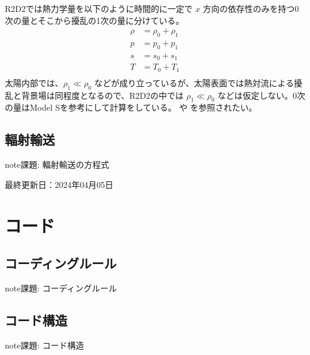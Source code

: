 \documentclass[letterpaper,10pt,dvipdfmx,report]{sphinxmanual}
\begin{document}
\sphinxAtStartPar
R2D2では熱力学量を以下のように時間的に一定で \(x\) 方向の依存性のみを持つ0次の量とそこから擾乱の1次の量に分けている。
\begin{equation*}
\begin{split}\rho &= \rho_0 + \rho_1 \\
p &= p_0 + p_1 \\
s &= s_0 + s_1 \\
T &= T_0 + T_1 \\\end{split}
\end{equation*}
\sphinxAtStartPar
太陽内部では、\(\rho_1 \ll \rho_0\) などが成り立っているが、太陽表面では熱対流による擾乱と背景場は同程度となるので、R2D2の中では \(\rho_1 \ll \rho_0\) などは仮定しない。0次の量はModel Sを参考にして計算をしている。 や  を参照されたい。


\section{輻射輸送}
\label{\detokenize{equation:id3}}
\begin{sphinxadmonition}{note}{\label{\detokenize{equation:id4}}課題:}
\sphinxAtStartPar
輻射輸送の方程式
\end{sphinxadmonition}

\sphinxAtStartPar
最終更新日：2024年04月05日

\sphinxstepscope


\chapter{コード}
\label{\detokenize{code:id1}}\label{\detokenize{code::doc}}

\section{コーディングルール}
\label{\detokenize{code:id2}}
\begin{sphinxadmonition}{note}{\label{\detokenize{code:id3}}課題:}
\sphinxAtStartPar
コーディングルール
\end{sphinxadmonition}


\section{コード構造}
\label{\detokenize{code:id4}}
\begin{sphinxadmonition}{note}{\label{\detokenize{code:id5}}課題:}
\sphinxAtStartPar
コード構造
\end{sphinxadmonition}
\end{document}
